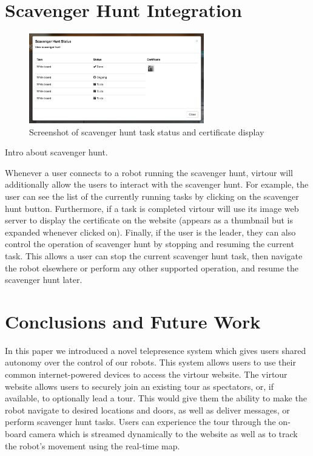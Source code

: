 \documentclass[
  oneside,
  11pt, a4paper,
  footinclude=true,
  headinclude=true,
  cleardoublepage=empty
]{article}
\begin{document}
\section{Scavenger Hunt Integration}

\begin{figure}
\centering
\includegraphics[width=3in]{scav_certs}
\caption{Screenshot of scavenger hunt task status and certificate display}
\end{figure}

Intro about scavenger hunt.

\cite{zhang2016}

Whenever a user connects to a robot running the scavenger hunt, virtour will
additionally allow the users to interact with the scavenger hunt. For example,
the user can see the list of the currently running tasks by clicking on the
scavenger hunt button. Furthermore, if a task is completed virtour will use its
image web server to display the certificate on the website (appears as a
thumbnail but is expanded whenever clicked on). Finally, if the user is the
leader, they can also control the operation of scavenger hunt by stopping and
resuming the current task. This allows a user can stop the current scavenger
hunt task, then navigate the robot elsewhere or perform any other supported
operation, and resume the scavenger hunt later.

\section{Conclusions and Future Work}

In this paper we introduced a novel telepresence system which gives users
shared autonomy over the control of our robots. This system allows users to use
their common internet-powered devices to access the virtour website. The
virtour website allows users to securely join an existing tour as spectators,
or, if available, to optionally lead a tour. This would give them the ability
to make the robot navigate to desired locations and doors, as well as deliver
messages, or perform scavenger hunt tasks. Users can experience the tour
through the on-board camera which is streamed dynamically to the website as
well as to track the robot's movement using the real-time map.
\end{document}
